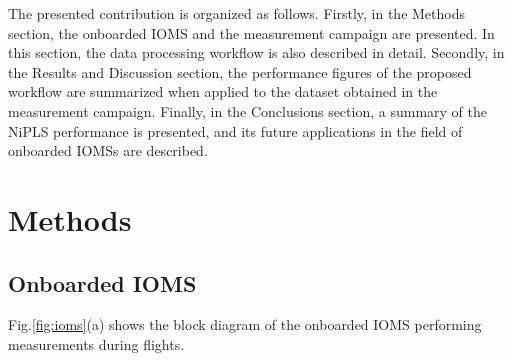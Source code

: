 \documentclass[final,3p,times,twocolumn]{elsarticle}
\begin{document}
The presented contribution is organized as follows. Firstly, in the Methods section, the onboarded IOMS and the measurement campaign are presented. In this section, the data processing workflow is also described in detail. Secondly, in the Results and Discussion section, the performance figures of the proposed workflow are summarized when applied to the dataset obtained in the measurement campaign. Finally, in the Conclusions section, a summary of the NiPLS performance is presented, and its future applications in the field of onboarded IOMSs are described.  

\section{Methods}
\label{sec:methods}
\subsection{Onboarded IOMS}
\label{ssec:IOMS}
Fig.\ref{fig:ioms}(a) shows the block diagram of the onboarded IOMS performing measurements during flights. 
\end{document}
